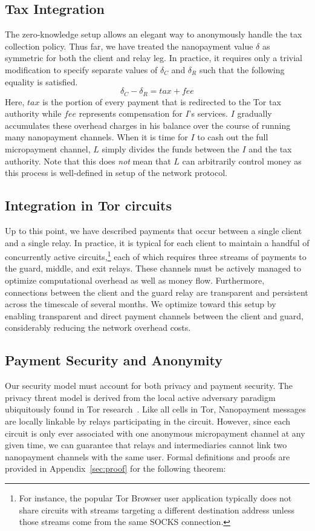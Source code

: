 \subsection{Tax Integration}

The zero-knowledge setup allows an elegant way to anonymously handle the
tax collection policy. Thus far, we have
treated the nanopayment value $\delta$ as symmetric for both the client and
relay leg. In practice, it requires only a trivial modification to specify
separate values of $\delta_C$ and $\delta_R$ such that the following equality is
satisfied.
\begin{equation}
  \delta_C - \delta_R = tax + fee
  \label{eq:payment}
\end{equation}
Here, $tax$ is the portion of every payment that is redirected to the Tor tax
authority while $fee$ represents compensation for $I$'s services. $I$ gradually
accumulates these overhead charges in his balance over the course of running
many nanopayment channels. When it is time for $I$ to cash out the full
micropayment channel, $L$ simply divides the funds between the $I$ and the tax
authority. Note that this does \emph{not} mean that $L$ can arbitrarily control
money as this process is well-defined in setup of the network protocol.

\subsection{Integration in Tor circuits}
Up to this point, we have described payments that occur between a single client
and a single relay. In practice, it is typical for each client to maintain a
handful of concurrently active circuits,\footnote{For instance, the popular Tor
  Browser user application typically does not share circuits with streams targeting a different destination address unless those streams come from the same SOCKS connection.}  each of
which requires three streams of payments to the guard, middle, and exit
relays. These channels must be actively managed to optimize computational
overhead as well as money flow. Furthermore, connections between the client and
the guard relay are transparent and persistent across the timescale of several
months. We optimize toward this setup by enabling transparent and direct payment
channels between the client and guard, considerably reducing the network
overhead costs.

\subsection{Payment Security and Anonymity}
\label{subsec:paysecurity}
Our security model must account for both privacy and payment security. The
privacy threat model is derived from the local active adversary paradigm
ubiquitously found in Tor research~\cite{dingledine2004tor}. Like all cells in
Tor, Nanopayment messages are locally linkable by relays participating in the
circuit. However, since each circuit is only ever associated with one anonymous
micropayment channel at any given time, we can guarantee that relays and
intermediaries cannot link two nanopayment channels with the same user. Formal
definitions and proofs are provided in Appendix~\ref{sec:proof} for the following theorem:

